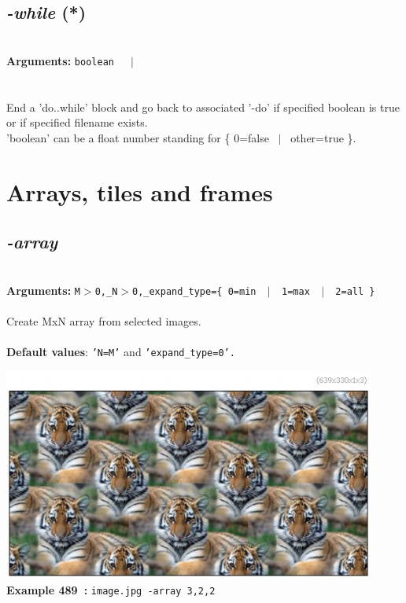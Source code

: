 \documentclass[a4paper,11pt,twoside]{book}
\begin{document}
\subsection{\emph{-while} (*)}\vspace*{-0.5em}
~\\\textbf{Arguments: } 
{\small \texttt{boolean}}~~~$|$\\
\\~\\
End a 'do..while' block and go back to associated '-do'
if specified boolean is true or if specified filename exists.
~\\'boolean' can be a float number standing for \{ 0=false ~$|$~ other=true \}.

\section{Arrays, tiles and frames}


\subsection{\emph{-array} }\vspace*{-0.5em}
~\\\textbf{Arguments: } 
{\small \texttt{M$>$0,\_N$>$0,\_expand\_type=\{ 0=min ~$|$~ 1=max ~$|$~ 2=all \}}}\\~\\
Create MxN array from selected images.
~\\~\\\textbf{Default values}: {\small \texttt{'N=M'} and \texttt{'expand\_type=0'.}}
\begin{center}\includegraphics[keepaspectratio=true,height=7cm,width=\textwidth]{img/gmic_def489.jpg}\\
{\footnotesize \textbf{Example 489~:} \texttt{image.jpg -array 3,2,2}}
\end{center}
\end{document}
